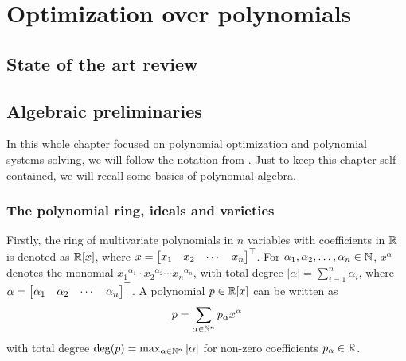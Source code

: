 \chapter{Optimization over polynomials}

\section{State of the art review}

\section{Algebraic preliminaries}
In this whole chapter focused on polynomial optimization and polynomial systems solving, we will follow the notation from \cite{Cox-Little-Shea97}.
Just to keep this chapter self-contained, we will recall some basics of polynomial algebra.

\subsection{The polynomial ring, ideals and varieties}
Firstly, the ring of multivariate polynomials in $n$ variables with coefficients in $\mathbb{R}$ is denoted as $\mathbb{R}[x]$, where $x = \begin{bmatrix} x_1 & x_2 & \cdots & x_n \end{bmatrix}^\top$.
For $\alpha_1, \alpha_2, \ldots, \alpha_n\in\mathbb{N}$, $x^\alpha$ denotes the monomial ${x_1}^{\alpha_1}\cdot{x_2}^{\alpha_2}\cdots{x_n}^{\alpha_n}$, with total degree $|\alpha| = \sum_{i=1}^n \alpha_i$, where $\alpha = \begin{bmatrix} \alpha_1 & \alpha_2 & \cdots & \alpha_n\end{bmatrix}^\top$.
A polynomial $p\in\mathbb{R}[x]$ can be written as
\begin{eqnarray}
  p = \sum_{\alpha\in\mathbb{N}^n} p_\alpha x^\alpha
\end{eqnarray}
with total degree $\deg(p) = \max_{\alpha\in\mathbb{N}^n}|\alpha|$ for non-zero coefficients $p_\alpha\in\mathbb{R}$.


